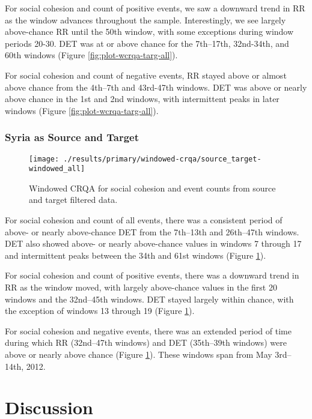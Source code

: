 \documentclass[english,man]{apa6}
\begin{document}
For social cohesion and count of positive events, we saw a downward trend in
RR as the window advances throughout the sample. Interestingly, we see
largely above-chance RR until the 50th window, with some exceptions during
window periods 20-30. DET was at or above chance for the 7th--17th, 32nd-34th,
and 60th windows (Figure \ref{fig:plot-wcrqa-targ-all}).

For social cohesion and count of negative events, RR stayed above
or almost above chance from the 4th--7th and 43rd-47th windows. DET
was above or nearly above chance in the 1st and 2nd windows, with intermittent
peaks in later windows (Figure \ref{fig:plot-wcrqa-targ-all}).

\hypertarget{syria-as-source-and-target-1}{%
\subsubsection{Syria as Source and Target}\label{syria-as-source-and-target-1}}

\begin{figure}
\texttt{[image: ./results/primary/windowed-crqa/source\_target-windowed\_all]} \caption{Windowed CRQA for social cohesion and event counts from source and target filtered data.}\label{fig:plot-wcrqa-source-targ-all}
\end{figure}

For social cohesion and count of all events, there was a consistent period of
above- or nearly above-chance DET from the 7th--13th and 26th--47th
windows. DET also showed above- or nearly above-chance values in windows 7
through 17 and intermittent peaks between the 34th and 61st windows
(Figure \ref{fig:plot-wcrqa-source-targ-all}).

For social cohesion and count of
positive events, there was a downward trend in RR as the window moved, with
largely above-chance values in the first 20 windows and the 32nd--45th windows.
DET stayed largely within chance, with the exception of windows 13
through 19 (Figure \ref{fig:plot-wcrqa-source-targ-all}).

For social cohesion
and negative events, there was an extended period of time during which RR
(32nd--47th windows) and DET (35th--39th windows) were above or nearly above
chance (Figure \ref{fig:plot-wcrqa-source-targ-all}). These windows span from
May 3rd--14th, 2012.

\hypertarget{discussion}{%
\section{Discussion}\label{discussion}}
\end{document}
